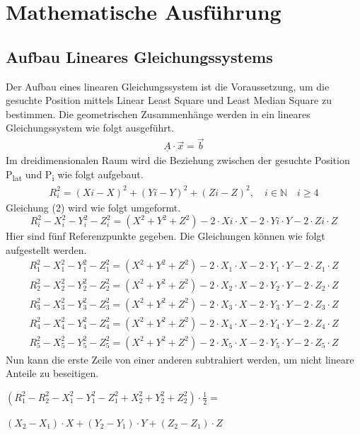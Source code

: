 \section{Mathematische Ausführung}

\subsection{Aufbau Lineares Gleichungssystems}
Der Aufbau eines linearen Gleichungssystem ist die Voraussetzung, um die gesuchte Position mittels Linear Least Square und Least Median Square zu bestimmen. Die geometrischen Zusammenhänge werden in ein lineares Gleichungssystem wie folgt ausgeführt.
\begin{align}
\underline{A} \cdot \vec{x}= \vec{b}
\end{align}
\newline
Im dreidimensionalen Raum wird die Beziehung zwischen der gesuchte Position P\textsubscript{lat} und P\textsubscript{i}  wie folgt aufgebaut.
\begin{align}
R^{2}_{i}=(X{i}-X)^{2}+(Y{i}-Y)^{2}+(Z{i}-Z)^{2},\quad i \in \mathbb{N}\quad i \ge 4
\end{align}
\newline
Gleichung (2) wird wie folgt umgeformt.
\[
R^{2}_{i} - X^{2}_{i} - Y^{2}_{i} - Z^{2}_{i} = 
(X^{2} + Y^{2} + Z^{2}) - 2 \cdot X{i}\cdot X -2 \cdot Y{i}\cdot Y-2 \cdot Z{i}\cdot Z
\]
\newline
Hier sind fünf Referenzpunkte gegeben. Die Gleichungen können wie folgt aufgestellt werden. 
\[
\begin{split}
R^{2}_{1} - X^{2}_{1} - Y^{2}_{1} - Z^{2}_{1} = 
(X^{2} + Y^{2} + Z^{2}) - 2 \cdot X_{1}\cdot X -2 \cdot Y_{1}\cdot Y-2 \cdot Z_{1}\cdot Z\\
R^{2}_{2} - X^{2}_{2} - Y^{2}_{2} - Z^{2}_{2} = 
(X^{2} + Y^{2} + Z^{2}) - 2 \cdot X_{2}\cdot X -2 \cdot Y_{2}\cdot Y-2 \cdot Z_{2}\cdot Z\\
R^{2}_{3} - X^{2}_{3} - Y^{2}_{3} - Z^{2}_{3} = 
(X^{2} + Y^{2} + Z^{2}) - 2 \cdot X_{3}\cdot X -2 \cdot Y_{3}\cdot Y-2 \cdot Z_{3}\cdot Z\\
R^{2}_{4} - X^{2}_{4} - Y^{2}_{4} - Z^{2}_{4} = 
(X^{2} + Y^{2} + Z^{2}) - 2 \cdot X_{4}\cdot X -2 \cdot Y_{4}\cdot Y-2 \cdot Z_{4}\cdot Z\\
R^{2}_{5} - X^{2}_{5} - Y^{2}_{5} - Z^{2}_{5} = 
(X^{2} + Y^{2} + Z^{2}) - 2 \cdot X_{5}\cdot X -2 \cdot Y_{5}\cdot Y-2 \cdot Z_{5}\cdot Z
\end{split}
\]
\newline
Nun kann die erste Zeile von einer anderen subtrahiert werden, um nicht lineare Anteile zu beseitigen.
\begin{flushleft}
$(R^{2}_{1} - R^{2}_{2} - X^{2}_{1} - Y^{2}_{1} - Z^{2}_{1} + 	X^{2}_{2} + Y^{2}_{2} + Z^{2}_{2}) \cdot \frac{1}{2} =$	
\end{flushleft}
\begin{flushright}
	$(X_{2}-X_{1})\cdot X + (Y_{2}-Y_{1}) \cdot Y +(Z_{2}-Z_{1}) \cdot Z$ \\
\end{flushright}

